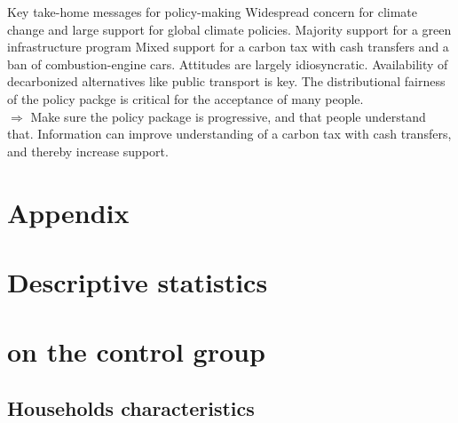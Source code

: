 \begin{framefont}{\small}
\begin{frame}{Key take-home messages for policy-making}
\bbvs
\ip Widespread concern for climate change and large support for global climate policies.
\ip Majority support for a green infrastructure program
\ip Mixed support for a carbon tax with cash transfers and a ban of combustion-engine cars. %
\ip Attitudes are largely idiosyncratic.
\ip Availability of decarbonized alternatives like public transport is key. 
\ip The distributional fairness of the policy packge is critical for the acceptance of many people. \\ $\Rightarrow$ Make sure the policy package is progressive, and that people understand that.
\ip Information can improve understanding of a carbon tax with cash transfers, and thereby increase support.
\ee
\end{frame}

\appendix
\section{Appendix}

\section{Descriptive statistics \\ \quad \\ on the control group}




\subsection{Households characteristics}


\end{framefont}
